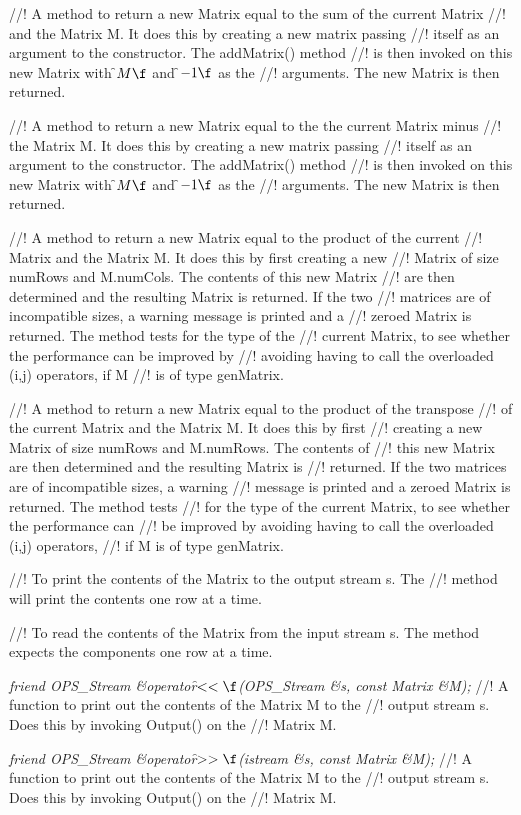 //! A method to return a new Matrix equal to the sum of the current Matrix
//! and the Matrix \p M. It does this by creating a new matrix passing
//! itself as an argument to the constructor. The addMatrix() method
//! is then invoked on this new Matrix with \f$M\f$ and \f$-1\f$ as the
//! arguments. The new Matrix is then returned. 

//! A method to return a new Matrix equal to the the current Matrix minus
//! the Matrix \p M. It does this by creating a new matrix passing
//! itself as an argument to the constructor. The addMatrix() method
//! is then invoked on this new Matrix with \f$M\f$ and \f$-1\f$ as the
//! arguments. The new Matrix is then returned. 

//! A method to return a new Matrix equal to the product of the current
//! Matrix and the Matrix \p M. It does this by first creating a new
//! Matrix of size numRows and M.numCols. The contents of this new Matrix
//! are then determined and the resulting Matrix is returned. If the two
//! matrices are of incompatible sizes, a warning message is printed and a
//! zeroed Matrix is returned. The method tests for the type of the
//! current Matrix, to see whether the performance can be improved by
//! avoiding having to call the overloaded (i,j) operators, if \p M 
//! is of type genMatrix.

//! A method to return a new Matrix equal to the product of the transpose
//! of the current Matrix and the Matrix \p M. It does this by first
//! creating a new Matrix of size numRows and M.numRows. The contents of
//! this new Matrix are then determined and the resulting Matrix is
//! returned. If the two matrices are of incompatible sizes, a warning
//! message is printed and a zeroed Matrix is returned. The method tests
//! for the type of the current Matrix, to see whether the performance can
//! be improved by avoiding having to call the overloaded (i,j) operators,
//! if \p M is of type genMatrix.

//! To print the contents of the Matrix to the output stream \p s. The
//! method will print the contents one row at a time. 

//! To read the contents of the Matrix from the input stream \p s. The method expects the components one row at a time.

{\em friend OPS_Stream \&operator\f$<<\f$(OPS_Stream \&s, const Matrix \&M);}
//! A function to print out the contents of the Matrix \p M to the
//! output stream \p s. Does this by invoking Output() on the
//! Matrix \p M. 

{\em friend OPS_Stream \&operator\f$>>\f$(istream \&s, const Matrix \&M);}
//! A function to print out the contents of the Matrix \p M to the
//! output stream \p s. Does this by invoking Output() on the
//! Matrix \p M. 

